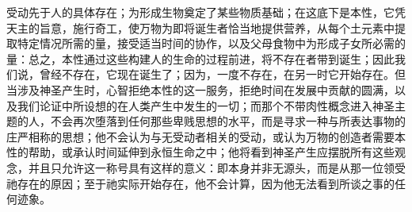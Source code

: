 受动先于人的具体存在；为形成生物奠定了某些物质基础；在这底下是本性，它凭天主的旨意，施行奇工，使万物为即将诞生者恰当地提供营养，从每个土元素中提取特定情况所需的量，接受适当时间的协作，以及父母食物中为形成子女所必需的量：总之，本性通过这些构建人的生命的过程前进，将不存在者带到诞生；因此我们说，曾经不存在，它现在诞生了；因为，一度不存在，在另一时它开始存在。但当涉及神圣产生时，心智拒绝本性的这一服务，拒绝时间在发展中贡献的圆满，以及我们论证中所设想的在人类产生中发生的一切；而那个不带肉性概念进入神圣主题的人，不会再次堕落到任何那些卑贱思想的水平，而是寻求一种与所表达事物的庄严相称的思想；他不会认为与无受动者相关的受动，或认为万物的创造者需要本性的帮助，或承认时间延伸到永恒生命之中；他将看到神圣产生应摆脱所有这些观念，并且只允许这一称号具有这样的意义：即本身并非无源头，而是从那一位领受祂存在的原因；至于祂实际开始存在，他不会计算，因为他无法看到所谈之事的任何迹象。\par

